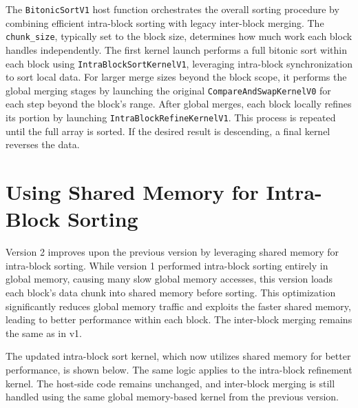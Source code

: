 \documentclass{article}
\begin{document}
The \texttt{BitonicSortV1} host function orchestrates the overall sorting procedure by combining efficient 
intra-block sorting with legacy inter-block merging. The \texttt{chunk\_size}, typically set to the block size, 
determines how much work each block handles independently. The first kernel launch performs a full bitonic sort
within each block using \texttt{IntraBlockSortKernelV1}, leveraging intra-block synchronization to sort local 
data. For larger merge sizes beyond the block scope, it performs the global merging stages by launching the 
original \texttt{CompareAndSwapKernelV0} for each step beyond the block’s range. After global merges, each 
block locally refines its portion by launching \texttt{IntraBlockRefineKernelV1}. This process is repeated 
until the full array is sorted. If the desired result is descending, a final kernel reverses the data. 




\section{Using Shared Memory for Intra-Block Sorting}

Version 2 improves upon the previous version by leveraging shared memory for intra-block sorting. 
While version 1 performed intra-block sorting entirely in global memory, causing many slow global 
memory accesses, this version loads each block's data chunk into shared memory before sorting. 
This optimization significantly reduces global memory traffic and exploits the faster shared memory, 
leading to better performance within each block. The inter-block merging remains the same as in v1.

The updated intra-block sort kernel, which now utilizes shared memory for better performance, is shown below. 
The same logic applies to the intra-block refinement kernel. The host-side code remains unchanged, and inter-block 
merging is still handled using the same global memory-based kernel from the previous version.
\end{document}
